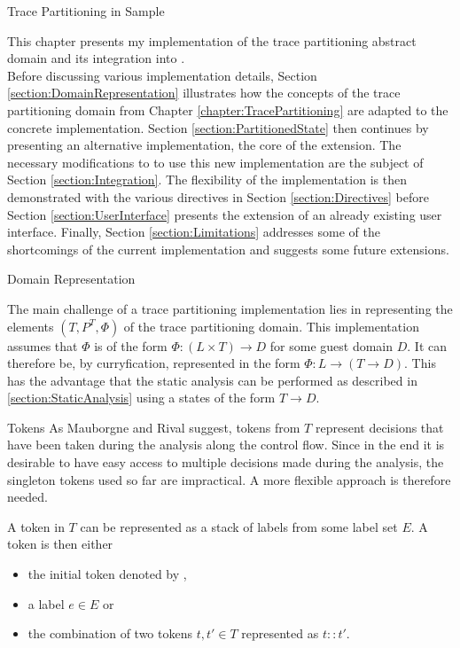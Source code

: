 \begin{chapter}{Trace Partitioning in Sample}
	\label{chapter:Extension}

	This chapter presents my implementation of the trace partitioning abstract domain and its integration into \sample.\\

	Before discussing various implementation details, Section \ref{section:DomainRepresentation} illustrates how the concepts of the trace partitioning domain from Chapter \ref{chapter:TracePartitioning} are adapted to the concrete implementation. Section \ref{section:PartitionedState} then continues by presenting an alternative  implementation, the core of the extension. The necessary modifications to \sample to use this new  implementation are the subject of Section \ref{section:Integration}. The flexibility of the implementation is then demonstrated with the various directives in Section \ref{section:Directives} before Section \ref{section:UserInterface} presents the extension of an already existing user interface. Finally, Section \ref{section:Limitations} addresses some of the shortcomings of the current implementation and suggests some future extensions.


	\begin{section}{Domain Representation}
		\label{section:DomainRepresentation}

		The main challenge of a trace partitioning implementation lies in representing the elements $(T, P^T, \Phi)$ of the trace partitioning domain. This implementation assumes that $\Phi$ is of the form $\Phi: (L \times T) \to D$ for some guest domain $D$. It can therefore be, by curryfication, represented in the form $\Phi: L \to (T \to D)$. This has the advantage that the static analysis can be performed as described in \ref{section:StaticAnalysis} using a states of the form $T \to D$. 


		\begin{subsection}{Tokens}
			As Mauborgne and Rival suggest, tokens from $T$ represent decisions that have been taken during the analysis along the control flow. Since in the end it is desirable to have easy access to multiple decisions made during the analysis, the singleton tokens used so far are impractical. A more flexible approach is therefore needed.

			\begin{definition}[Token]
				A token in $T$ can be represented as a stack of labels from some label set $E$. A token is then either
				\begin{itemize}
					\item the initial token denoted by \emph{},
					\item a label $e \in E$ or
					\item the combination of two tokens $t,t' \in T$ represented as $t::t'$.
				\end{itemize}
			\end{definition}


\end{subsection}
\end{section}
\end{chapter}
